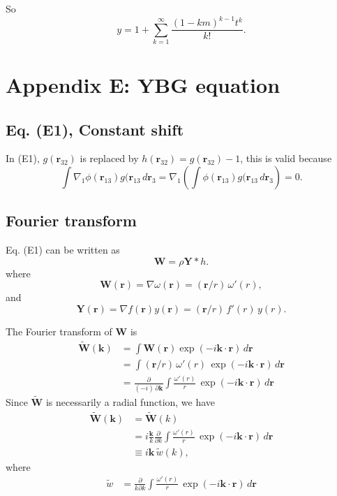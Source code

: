 \documentclass[aip,jcp,reprint,superscriptaddress]{revtex4-1}
\numberwithin{equation}{subsection}
\newcommand{\vct}[1]{\mathbf{#1}}
\providecommand{\vr}{} %
\renewcommand{\vr}{\vct{r}}
\newcommand{\vk}{\vct{k}}
\begin{document}
So
\[
  y
=
1 + \sum_{k = 1}^\infty
\frac{ (1 - k m)^{k-1} t^k } { k! }.
\]




\section{Appendix E: YBG equation}

\subsection{Eq. (E1), Constant shift}

In (E1), $g(\vr_{32})$ is replaced by $h(\vr_{32}) = g(\vr_{32}) - 1$,
this is valid because
\[
 \int \nabla_1 \phi(\vr_{13}) g(\vr_{13} \, d\vr_3
= \nabla_1 \left( \int \phi(\vr_{13}) g(\vr_{13} \, d\vr_3 \right)
= 0.
\]


\subsection{Fourier transform}

Eq. (E1) can be written as
\[
  \vct{W}
=
\rho \vct{Y} * h.
\]
where
\[
  \vct{W}(\vr) = \nabla \omega(\vr) = (\vr/r) \, \omega'(r),
\]
and
\[
  \vct{Y}(\vr) = \nabla f(\vr) y(\vr)
  = (\vr/r) \, f'(r) \, y(r).
\]

The Fourier transform of $\vct W$ is
\begin{align*}
  \tilde{\vct{W}}(\vk)
&=
\int \vct{W}(\vr) \exp(-i\vk\cdot\vr) \, d\vr
\\
&=
\int (\vr/r) \, \omega'(r) \, \exp(-i\vk\cdot\vr) \, d\vr
\\
&=
\frac{\partial}{(-i) \, \partial \vk}
\int \frac{\omega'(r)}{r} \, \exp(-i\vk\cdot\vr) \, d\vr
\end{align*}
%
Since $\tilde{\vct{W}}$ is necessarily a radial function,
we have
\begin{align*}
  \tilde{\vct{W}}(\vk)
&=
  \tilde{\vct{W}}(k)
\\
&=
i \frac{\vk}{k} \frac{\partial}{\partial k}
\int \frac{\omega'(r)}{r} \, \exp(-i\vk\cdot\vr) \, d\vr
\\
&\equiv
i \vk \, \tilde{w}(k),
\end{align*}
where
\begin{align*}
\tilde{w}
&=
\frac{\partial}{k\partial k}
\int \frac{\omega'(r)}{r} \, \exp(-i\vk\cdot\vr) \, d\vr
\end{align*}
\end{document}
